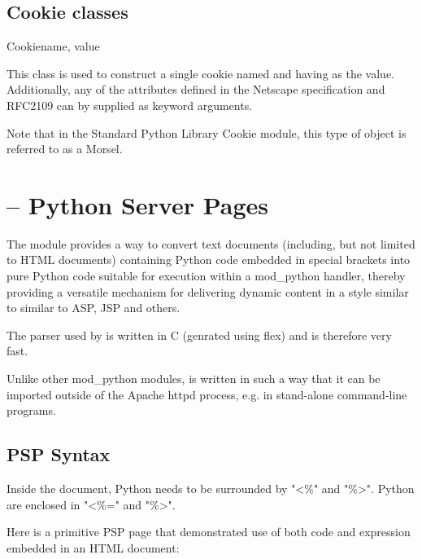 \subsection{Cookie classes\label{pyapi-cookie-classes}}

\begin{classdesc}{Cookie}{name, value}

This class is used to construct a single cookie named 
and having  as the value. Additionally, any of the 
attributes defined in the Netscape specification and RFC2109 can by
supplied as keyword arguments.

Note that in the Standard Python Library Cookie module, this type
of object is referred to as a Morsel.

\end{classdesc}

\section{ -- Python Server Pages\label{pyapi-psp}}

The  module provides a way to convert text documents
(including, but not limited to HTML documents) containing Python code
embedded in special brackets into pure Python code suitable for
execution within a mod_python handler, thereby providing a versatile
mechanism for delivering dynamic content in a style similar to similar
to ASP, JSP and others.

The parser used by  is written in C (genrated using flex)
and is therefore very fast.

Unlike other mod_python modules,  is written in such a way
that it can be imported outside of the Apache httpd process, e.g. in
stand-alone command-line programs.

\subsection{PSP Syntax\label{pyapi-psp-syntax}}

Inside the document, Python  needs to be surrounded by "<\%"
and "\%>". Python  are enclosed in "<\%=" and
"\%>".

Here is a primitive PSP page that demonstrated use of both code and
expression embedded in an HTML document:

